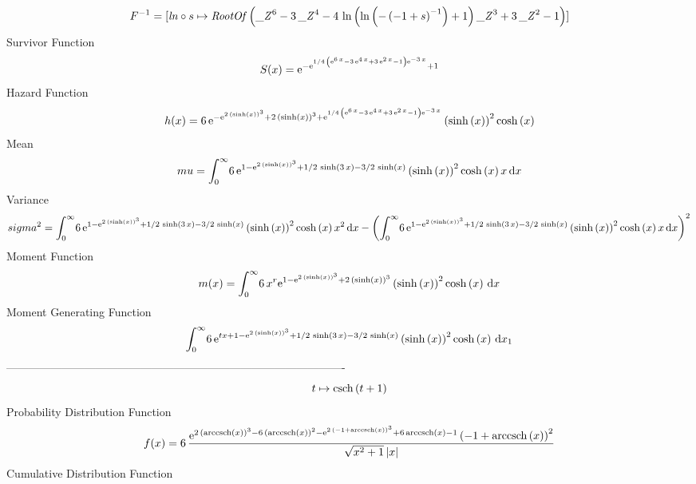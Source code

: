 \documentclass[12pt]{article}
\begin{document}
  $$F^{-1} = [{\it ln}\circ s\mapsto {\it RootOf} \left( {{\it \_Z}}^{6}-3\,{{\it 
\_Z}}^{4}-4\,\ln  \left( \ln  \left( - \left( -1+s \right) ^{-1}
 \right) +1 \right) {{\it \_Z}}^{3}+3\,{{\it \_Z}}^{2}-1 \right) ]
$$Survivor Function 
 $$ S(x)={{\rm e}^{-{{\rm e}^{1/4\, \left( {{\rm e}^{6\,x}}-3\,{{\rm e}^{4\,x}}
+3\,{{\rm e}^{2\,x}}-1 \right) {{\rm e}^{-3\,x}}}}+1}}
$$ Hazard Function 
 $$ h(x)=6\,{{\rm e}^{-{{\rm e}^{2\, \left( \sinh \left( x \right)  \right) ^{3
}}}+2\, \left( \sinh \left( x \right)  \right) ^{3}+{{\rm e}^{1/4\,
 \left( {{\rm e}^{6\,x}}-3\,{{\rm e}^{4\,x}}+3\,{{\rm e}^{2\,x}}-1
 \right) {{\rm e}^{-3\,x}}}}}} \left( \sinh \left( x \right)  \right) 
^{2}\cosh \left( x \right) 
$$Mean 
 $$ mu=\int_{0}^{\infty }\!6\,{{\rm e}^{1-{{\rm e}^{2\, \left( \sinh \left( x
 \right)  \right) ^{3}}}+1/2\,\sinh \left( 3\,x \right) -3/2\,\sinh
 \left( x \right) }} \left( \sinh \left( x \right)  \right) ^{2}\cosh
 \left( x \right) x\,{\rm d}x
$$ Variance 
 $$ sigma^2 = \int_{0}^{\infty }\!6\,{{\rm e}^{1-{{\rm e}^{2\, \left( \sinh \left( x
 \right)  \right) ^{3}}}+1/2\,\sinh \left( 3\,x \right) -3/2\,\sinh
 \left( x \right) }} \left( \sinh \left( x \right)  \right) ^{2}\cosh
 \left( x \right) {x}^{2}\,{\rm d}x- \left( \int_{0}^{\infty }\!6\,{
{\rm e}^{1-{{\rm e}^{2\, \left( \sinh \left( x \right)  \right) ^{3}}}
+1/2\,\sinh \left( 3\,x \right) -3/2\,\sinh \left( x \right) }}
 \left( \sinh \left( x \right)  \right) ^{2}\cosh \left( x \right) x
\,{\rm d}x \right) ^{2}
$$Moment Function 
 $$ m(x) = \int_{0}^{\infty }\!6\,{x}^{r}{{\rm e}^{1-{{\rm e}^{2\, \left( \sinh
 \left( x \right)  \right) ^{3}}}+2\, \left( \sinh \left( x \right) 
 \right) ^{3}}} \left( \sinh \left( x \right)  \right) ^{2}\cosh
 \left( x \right) \,{\rm d}x
$$ Moment Generating Function 
 $$\int_{0}^{\infty }\!6\,{{\rm e}^{tx+1-{{\rm e}^{2\, \left( \sinh
 \left( x \right)  \right) ^{3}}}+1/2\,\sinh \left( 3\,x \right) -3/2
\,\sinh \left( x \right) }} \left( \sinh \left( x \right)  \right) ^{2
}\cosh \left( x \right) \,{\rm d}x_{{1}}
$$-------------------------------------------------------------------------------------------  \\$$t\mapsto {\rm csch} \left(t+1\right)
$$Probability Distribution Function 
$$  f(x)=6\,{\frac {{{\rm e}^{2\, \left( {\rm arccsch} \left(x\right) \right) ^
{3}-6\, \left( {\rm arccsch} \left(x\right) \right) ^{2}-{{\rm e}^{2\,
 \left( -1+{\rm arccsch} \left(x\right) \right) ^{3}}}+6\,
{\rm arccsch} \left(x\right)-1}} \left( -1+{\rm arccsch} \left(x
\right) \right) ^{2}}{\sqrt {{x}^{2}+1} \left| x \right| }}
$$Cumulative Distribution Function  
\end{document}
